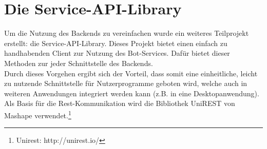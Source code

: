 \section{Die Service-API-Library}
Um die Nutzung des Backends zu vereinfachen wurde ein weiteres Teilprojekt erstellt: die Service-API-Library. Dieses Projekt bietet einen einfach zu handhabenden Client zur Nutzung des Bot-Services. Dafür bietet dieser Methoden zur jeder Schnittstelle des Backends.\\
Durch dieses Vorgehen ergibt sich der Vorteil, dass somit eine einheitliche, leicht zu nutzende Schnittstelle für Nutzerprogramme geboten wird, welche auch in weiteren Anwendungen integriert werden kann (z.B. in eine Desktopanwendung).\\
Als Basis für die Rest-Kommunikation wird die Bibliothek UniREST von Mashape verwendet.\footnote{Unirest: http://unirest.io/}